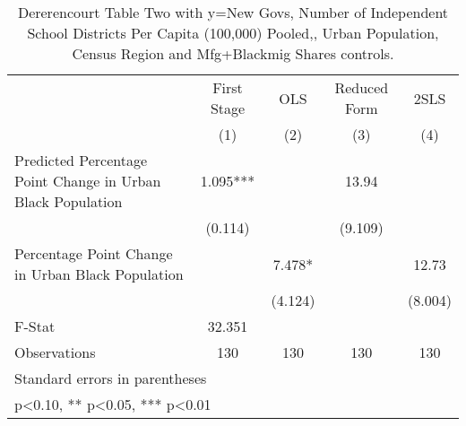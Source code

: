 \begin{table}[htbp]\centering
\def\sym#1{\ifmmode^{#1}\else\(^{#1}\)\fi}
\caption{Dererencourt Table Two with y=New Govs, Number of Independent School Districts Per Capita (100,000) Pooled,, Urban Population, Census Region and Mfg+Blackmig Shares controls.}
\begin{tabular}{l*{4}{c}}
\toprule
                    & First Stage   &         OLS   &Reduced Form   &        2SLS   \\
                    &\multicolumn{1}{c}{(1)}   &\multicolumn{1}{c}{(2)}   &\multicolumn{1}{c}{(3)}   &\multicolumn{1}{c}{(4)}   \\
\midrule
Predicted Percentage Point Change in Urban Black Population&       1.095***&               &       13.94   &               \\
                    &     (0.114)   &               &     (9.109)   &               \\
\addlinespace
Percentage Point Change in Urban Black Population&               &       7.478*  &               &       12.73   \\
                    &               &     (4.124)   &               &     (8.004)   \\
\midrule
F-Stat              &      32.351   &               &               &               \\
Observations        &         130   &         130   &         130   &         130   \\
\bottomrule
\multicolumn{5}{l}{\footnotesize Standard errors in parentheses}\\
\multicolumn{5}{l}{\footnotesize * p<0.10, ** p<0.05, *** p<0.01}\\
\end{tabular}
\end{table}
